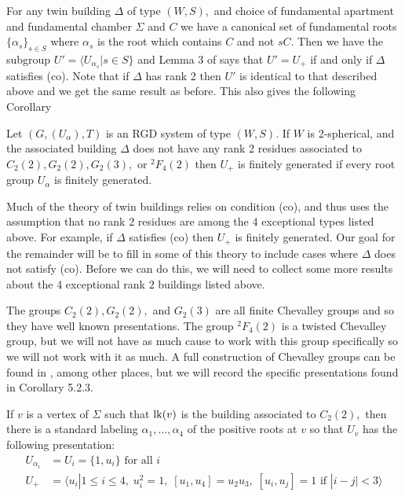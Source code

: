\documentclass[class=book, crop=false,12 pt]{standalone}
\begin{document}
For any twin building $\Delta$ of type $(W,S),$ and choice of fundamental apartment and fundamental chamber $\Sigma$ and $C$ we have a canonical set of fundamental roots $\{\alpha_s\}_{s\in S}$ where $\alpha_s$ is the root which contains $C$ and not $sC.$ Then we have the subgroup $U'=\langle U_{\alpha_s}|s\in S\}$ and Lemma 3 of \cite{cop} says that $U'=U_+$ if and only if $\Delta$ satisfies (co). Note that if $\Delta$ has rank 2 then $U'$ is identical to that described above and we get the same result as before. This also gives the following Corollary

\begin{cor}
	\label{cor:cofg}
	Let $(G,(U_\alpha),T)$ is an RGD system of type $(W,S).$ If $W$ is 2-spherical, and the associated building $\Delta$ does not have any rank 2 residues associated to $C_2(2),G_2(2),G_2(3),$ or ${}^2F_4(2)$ then $U_+$ is finitely generated if every root group $U_\alpha$ is finitely generated.
\end{cor}

Much of the theory of twin buildings relies on condition (co), and thus uses the assumption that no rank 2 residues are among the 4 exceptional types listed above. For example, if $\Delta$ satisfies (co) then $U_+$ is finitely generated. Our goal for the remainder will be to fill in some of this theory to include cases where $\Delta$ does not satisfy (co). Before we can do this, we will need to collect some more results about the 4 exceptional rank 2 buildings listed above.

The groups $C_2(2),G_2(2),$ and $G_2(3)$ are all finite Chevalley groups and so they have well known presentations. The group ${}^2F_4(2)$ is a twisted Chevalley group, but we will not have as much cause to work with this group specifically so we will not work with it as much. A full construction of Chevalley groups can be found in \cite{carter}, among other places, but we will record the specific presentations found in Corollary 5.2.3.

\begin{lemma}
	\label{lem:c22pres}
	If $v$ is a vertex of $\Sigma$ such that $\mathrm{lk}(v)$ is the building associated to $C_2(2),$ then there is a standard labeling $\alpha_1,\dots,\alpha_4$ of the positive roots at $v$ so that $U_v$ has the following presentation:
	\begin{align*}
		U_{\alpha_i}&=U_i=\{1,u_i\}\text{ for all }i\\
		U_+&=\langle u_i|1\le i\le 4,\;u_i^2=1,\;[u_1,u_4]=u_2u_3,\;[u_i,u_j]=1\text{ if }|i-j|<3\rangle
	\end{align*}
\end{lemma}
\end{document}
